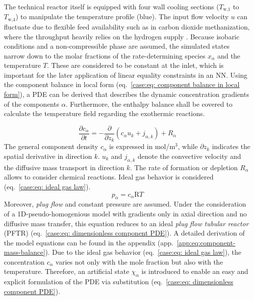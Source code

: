 The technical reactor itself is equipped with four wall cooling sections ($T_{\text{w,1}}$ to $T_{\text{w,4}}$) to manipulate the temperature profile (blue).
The input flow velocity $u$ can fluctuate due to flexible feed availability such as in carbon dioxide methanization,
where the throughput heavily relies on the hydrogen supply \cite{fischer2021}. Because isobaric conditions and a non-compressible phase are assumed,
the simulated states narrow down to the molar fractions of the rate-determining species $x_\alpha$ and the temperature $T$.
These are considered to be constant at the inlet, which is important for the later application of 
linear equality constraints in an NN. 
Using the component balance in local form (eq.~\ref{case:eq: component balance in local form}), a PDE can be derived that
describes the dynamic concentration gradients of the components $\alpha$.
Furthermore, the enthalpy balance shall be covered to calculate the temperature field regarding the exothermic
reactions.

\begin{equation}
    \label{case:eq: component balance in local form}
    \frac{\partial c_\alpha}{\partial t} = - \frac{\partial}{\partial z_k} (c_\alpha u_k + j_{\alpha, k}) + R_\alpha
\end{equation}
The general component density $c_\alpha$ is expressed in mol/m$^3$, while $\partial z_k$ indicates
the spatial derivative in direction $k$. $u_k$ and $j_{\alpha, k}$ denote the convective velocity and the 
diffusive mass transport in direction $k$. The rate of formation or depletion $R_\alpha$ allows to consider chemical reactions.
Ideal gas behavior is considered (eq.~\ref{case:eq: ideal gas law}).
\begin{equation}
    \label{case:eq: ideal gas law}
    p_\alpha = c_\alpha \mathrm{R} T
\end{equation}
Moreover, \emph{plug flow} and constant pressure are assumed. 
Under the consideration of a 1D-pseudo-homogenious model with gradients only in axial direction and no
diffusive mass transfer, this equation reduces to an ideal \emph{plug flow tubular reactor} (PFTR) (eq.~\ref{case:eq: dimensionless component PDE}).
A detailed derivation of the model equations can be found in the appendix (app.~\ref{app:eq:component-mass-balance}). 
Due to the ideal gas behavior (eq.~\ref{case:eq: ideal gas law}), the concentration $c_\alpha$ varies not only
with the mole fraction but also with the temperature. Therefore, an artificial state $\chi_\alpha$ is introduced
to enable an easy and explicit formulation of the PDE via substitution (eq.~\ref{case:eq: dimensionless component PDE}).

